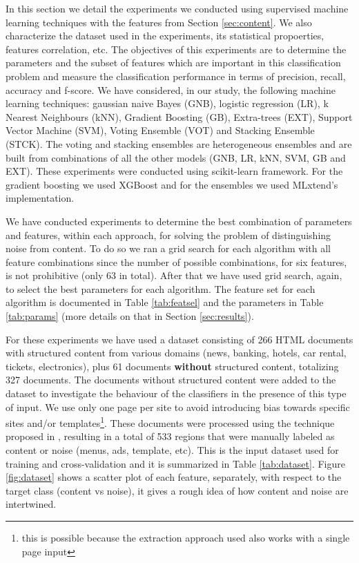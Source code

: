 In this section we detail the experiments we conducted using supervised machine
learning techniques with the features from Section \ref{sec:content}. We also
characterize the dataset used in the experiments, its statistical propoerties,
features correlation, etc. The objectives of this experiments are to determine
the parameters and the subset of features which are important in this
classification problem and measure the classification performance in terms of
precision, recall, accuracy and f-score.
We have considered, in our study, the following machine learning techniques:
gaussian naive Bayes (GNB), logistic regression (LR), k Nearest Neighbours
(kNN), Gradient Boosting (GB), Extra-trees (EXT), Support Vector Machine (SVM),
Voting Ensemble (VOT) and Stacking Ensemble (STCK). The voting and stacking
ensembles are heterogeneous ensembles and are built from combinations of all the
other models (GNB, LR, kNN, SVM, GB and EXT). These experiments were conducted
using scikit-learn\cite{scikit-learn} framework. For the gradient boosting we
used XGBoost\cite{Chen:2016:XST:2939672.2939785} and for the ensembles we used
MLxtend's\cite{raschkas_2018_mlxtend} implementation.

We have conducted experiments to determine the best combination of parameters
and features, within each approach, for solving the problem of distinguishing
noise from content. To do so we ran a grid search for each algorithm with all
feature combinations since the number of possible combinations, for six
features, is not prohibitive (only 63 in total).
After that we have used grid search, again, to select the best parameters for
each algorithm. The feature set for each algorithm is documented in Table
\ref{tab:featsel} and the parameters in Table \ref{tab:params} (more details
on that in Section \ref{sec:results}).

For these experiments we have used a dataset consisting of 266 HTML documents
with structured content from various domains (news, banking, hotels, car rental,
tickets, electronics), plus 61 documents \textbf{without} structured content,
totalizing 327 documents. The documents without structured content were added to
the dataset to investigate the behaviour of the classifiers in the presence of
this type of input.
We use only one page per site to avoid introducing bias towards specific sites
and/or templates\footnote{this is possible because the extraction approach used
also works with a single page input}. These documents were processed using the
technique proposed in \cite{Velloso:2017:ERW:3132847.3132875}, resulting in a
total of 533 regions that were manually labeled as content or noise (menus, ads,
template, etc). This is the input dataset used for training and cross-validation
and it is summarized in Table \ref{tab:dataset}. Figure \ref{fig:dataset} shows
a scatter plot of each feature, separately, with respect to the target class
(content vs noise), it gives a rough idea of how content and noise are
intertwined. 

